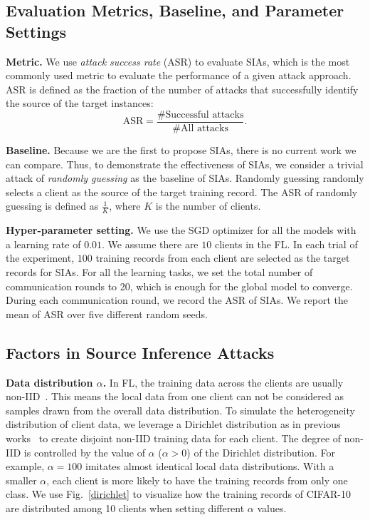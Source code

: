\documentclass[10pt,journal,compsoc]{IEEEtran}
\begin{document}
\subsection{Evaluation Metrics, Baseline, and Parameter Settings}

\noindent \textbf{Metric. \;} We use \textit{attack success rate} (ASR) to evaluate SIAs, which is the most commonly used metric to evaluate the performance of a given attack approach. {ASR \cite{hu2022membership} is defined as the fraction of the number of attacks that successfully identify the source of the target instances:}
\begin{equation*}
    \textrm{ASR} = \frac{\textrm{\# Successful attacks}}{\textrm{\# All attacks}}.
\end{equation*}


\noindent \textbf{Baseline. \;} Because we are the first to propose SIAs, there is no current work we can compare. Thus, to demonstrate the effectiveness of SIAs, we consider a trivial attack of \textit{randomly guessing} as the baseline of SIAs. Randomly guessing randomly selects a client as the source of the target training record. The ASR of randomly guessing is defined as $\frac{1}{K}$, where $K$ is the number of clients.

\noindent \textbf{Hyper-parameter setting. \;} We use the SGD optimizer for all the models with a learning rate of $0.01$. We assume there are $10$ clients in the FL. In each trial of the experiment, $100$ training records from each client are selected as the target records for SIAs. For all the learning tasks, we set the total number of communication rounds to 20, which is enough for the global model to converge. During each communication round, we record the ASR of SIAs. We report the mean of ASR over five different random seeds.

\subsection{Factors in Source Inference Attacks}

\noindent\textbf{Data distribution $\alpha$. \;} In FL, the training data across the clients are usually non-IID~\cite{li2020federated}. This means the local data from one client can not be considered as samples drawn from the overall data distribution. To simulate the heterogeneity distribution of client data, we leverage a Dirichlet distribution as in previous works~\cite{xie2019dba,bagdasaryan2020backdoor,lin2020ensemble,yurochkin2019bayesian,hsu2019measuring} to create disjoint non-IID training data for each client. The degree of non-IID is controlled by the value of $\alpha$ ($\alpha>0$) of the Dirichlet distribution. For example, $\alpha=100$ imitates almost identical local data distributions. With a smaller $\alpha$, each client is more likely to have the training records from only one class. We use Fig.~\ref{dirichlet} to visualize how the training records of CIFAR-10 are distributed among 10 clients when setting different $\alpha$ values. 
\end{document}
